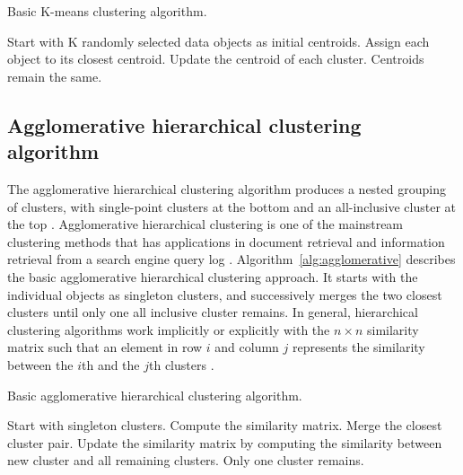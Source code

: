 
\begin{algorithm}
\caption{Basic K-means clustering algorithm.} \label{alg:k-means}
\begin{algorithmic}[1]
\State Start with K randomly selected data objects as initial centroids.
\Repeat
\State Assign each object to its closest centroid.
\State Update the centroid of each cluster.
\Until Centroids remain the same.
\end{algorithmic}
\end{algorithm}



\subsection{Agglomerative hierarchical clustering algorithm}
The agglomerative hierarchical clustering algorithm produces a nested grouping of clusters, with single-point clusters at the bottom and an all-inclusive cluster at the top \cite{karypis1999chameleon}. Agglomerative hierarchical clustering is one of the mainstream clustering methods \cite{day1984efficient} that has applications in document retrieval \cite{voorhees1986implementing} and information retrieval from a search engine query log \cite{beeferman2000agglomerative}. Algorithm~\ref{alg:agglomerative} describes the basic agglomerative hierarchical clustering approach. It starts with the individual objects as singleton clusters, and successively merges the two closest clusters until only one all inclusive cluster remains. In general, hierarchical clustering algorithms work implicitly or explicitly with the $n \times n$ similarity matrix such that an element in row $i$ and column $j$ represents the similarity between the $i$th and the $j$th clusters \cite{karypis1999chameleon}.


\begin{algorithm}
\caption{Basic agglomerative hierarchical clustering algorithm.} \label{alg:agglomerative}
\begin{algorithmic}[1]
\State Start with singleton clusters.
\State Compute the similarity matrix.
\Repeat
\State Merge the closest cluster pair.
\State Update the similarity matrix by computing the similarity between new cluster and all remaining clusters.
\Until Only one cluster remains.
\end{algorithmic}
\end{algorithm}





